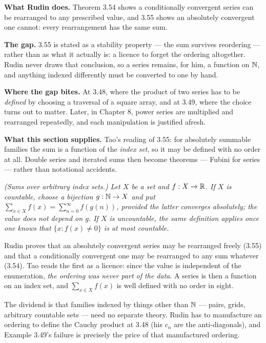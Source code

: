 \begin{roadmap}
\raggedright
\textbf{What Rudin does.} Theorem 3.54 shows a conditionally convergent
series can be rearranged to any prescribed value, and 3.55 shows an
absolutely convergent one cannot: every rearrangement has the same sum.

\smallskip
\textbf{The gap.} 3.55 is stated as a stability property --- the sum survives
reordering --- rather than as what it actually is: a licence to forget the
ordering altogether. Rudin never draws that conclusion, so a series remains,
for him, a function on $\mathbb{N}$, and anything indexed differently must be
converted to one by hand.

\smallskip
\textbf{Where the gap bites.} At 3.48, where the product of two series has to
be \emph{defined} by choosing a traversal of a square array, and at 3.49,
where the choice turns out to matter. Later, in Chapter 8, power series are
multiplied and rearranged repeatedly, and each manipulation is justified
afresh.

\smallskip
\textbf{What this section supplies.} Tao's reading of 3.55: for absolutely
summable families the sum is a function of the \emph{index set}, so it may be
defined with no order at all. Double series and iterated sums then become
theorems --- Fubini for series --- rather than notational accidents.
\end{roadmap}

\emph{(Sums over arbitrary index sets.) Let $X$ be a set and
$f : X \to \mathbb{R}$. If $X$ is countable, choose a bijection $g : \mathbb{N} \to X$ and
put $\sum_{x \in X} f(x) = \sum_{n=0}^{\infty} f(g(n))$, provided the latter
converges absolutely; the value does not depend on $g$. If $X$ is
uncountable, the same definition applies once one knows that
$\{x : f(x) \ne 0\}$ is at most countable.}

\begin{unpack}
Rudin proves that an absolutely convergent series may be rearranged freely
(3.55) and that a conditionally convergent one may be rearranged to any sum
whatever (3.54). Tao reads the first as a licence: since the value is
independent of the enumeration, \emph{the ordering was never part of the
data}. A series is then a function on an index set, and $\sum_{x\in X}f(x)$
is well defined with no order in sight.

The dividend is that families indexed by things other than $\mathbb{N}$ --- pairs,
grids, arbitrary countable sets --- need no separate theory. Rudin has to
manufacture an ordering to define the Cauchy product at 3.48 (his $c_n$ are
the anti-diagonals), and Example 3.49's failure is precisely the price of
that manufactured ordering.
\end{unpack}


